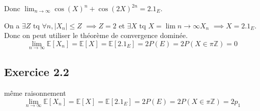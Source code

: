 \documentclass[]{book}
\theoremstyle{definition}
\newcommand{\bb}[1]{\mathbb{#1}}
\newcommand{\Z}{\bb{Z}}
\newcommand{\E}{\bb{E}}
\begin{document}
Donc $\lim_{n \to \infty}{\cos(X)^{n}+\cos(2X)^{2n}} = 2.1_{E}$. 

On a $\exists Z \text{ tq } \forall n, |X_n| \leq Z$ $\implies Z = 2$ et $\exists X \text{ tq } X = \lim{n \to \infty}{X_n}$ $\implies X = 2.1_E$. Donc on peut utiliser le th\'eor\`eme de convergence domin\'ee.
$$
\lim_{n \to \infty} \E[X_n] = \E[X] = \E[2.1_E] = 2P(E) = 2P(X \in \pi \Z) = 0
$$

\subsection*{Exercice 2.2}
m\^eme raisonnement
$$
\lim_{n \to \infty} \E[X_n] = \E[X] = \E[2.1_E] = 2P(E) = 2P(X \in \pi \Z) = 2p_1
$$
\end{document}
